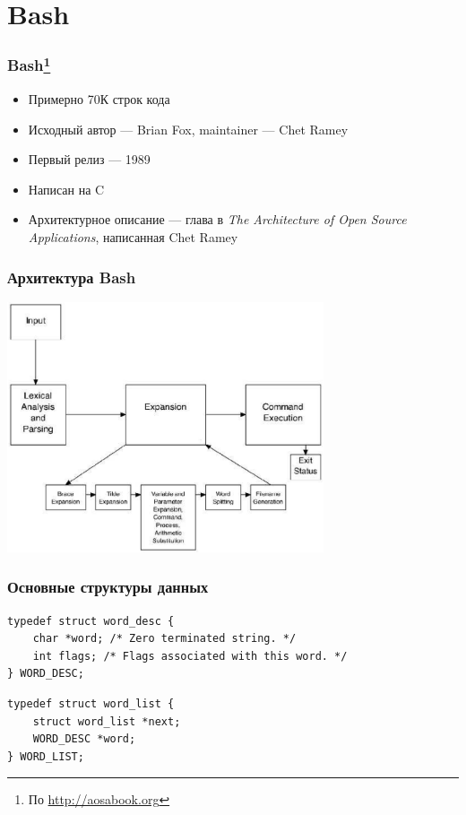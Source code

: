 \documentclass{../mcsslides}
\begin{document}
    \section{Bash}

    \begin{frame}
        \frametitle{Bash\footnote{\tiny{По \url{http://aosabook.org}}}}
        \begin{itemize}
            \item Примерно 70К строк кода
            \item Исходный автор --- Brian Fox, maintainer --- Chet Ramey
            \item Первый релиз --- 1989
            \item Написан на C
            \item Архитектурное описание --- глава в \textit{The Architecture of Open Source Applications}, написанная Chet Ramey
        \end{itemize}
    \end{frame}

    \begin{frame}
        \frametitle{Архитектура Bash}
        \begin{center}
            \includegraphics[width=0.7\textwidth]{bashArchitecture.png}
        \end{center}
    \end{frame}

    \begin{frame}[fragile]
        \frametitle{Основные структуры данных}
        \begin{verbatim}
typedef struct word_desc {
    char *word; /* Zero terminated string. */
    int flags; /* Flags associated with this word. */
} WORD_DESC;
        \end{verbatim}

        \vspace{3mm}

        \begin{verbatim}
typedef struct word_list {
    struct word_list *next;
    WORD_DESC *word;
} WORD_LIST;
        \end{verbatim}
    \end{frame}
\end{document}
